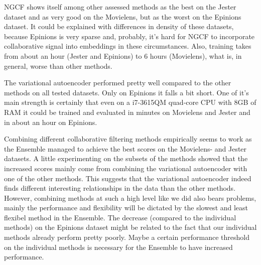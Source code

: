 


NGCF shows itself among other assessed methods as the best on the Jester dataset 
and as very good on the Movielens, but as the worst on the Epinions dataset.
It could be explained with differences in density of these datasets, because
Epinions is very sparse and, probably, it's hard for NGCF to incorporate 
collaborative signal into embeddings in these circumstances.
Also, training takes from about an hour (Jester and Epinions) to 6 hours (Movielens),
what is, in general, worse than other methods.

The variational autoencoder performed pretty well compared to the other methods on all tested datasets. 
Only on Epinions it falls a bit short. One of it's main strength is certainly that even on 
a i7-3615QM quad-core CPU with 8GB of RAM it could be trained and evaluated in 
minutes on Movielens and Jester and in about an hour on Epinions.


Combining different collaborative filtering methods empirically seems to work as 
the Ensemble managed to achieve the best scores on the Movielens- and Jester datasets. 
A little experimenting on the subsets of the methods showed that the increased scores mainly 
come from combining the variational autoencoder with one of the other methods. 
This suggests that the variational autoencoder indeed finds different interesting 
relationships in the data than the other methods. However, combining methods at 
such a high level like we did also bears problems, mainly the performance and 
flexibility will be dictated by the slowest and least flexibel method in the Ensemble. 
The decrease (compared to the individual methods) on the Epinions dataset might be 
related to the fact that our individual methods already perform pretty poorly. 
Maybe a certain performance threshold on the individual methods is necessary 
for the Ensemble to have increased performance.
